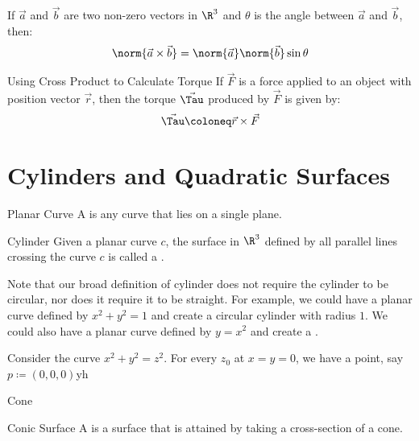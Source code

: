\documentclass[12pt]{report}
\begin{document}
\begin{thmbox}{}{}
    If $\vec{a}$ and $\vec{b}$ are two non-zero vectors in $\R^3$ and $\theta$ is the angle between $\vec{a}$ and $\vec{b}$, then:
    \[ \norm{\vec{a} \times \vec{b}} = \norm{\vec{a}} \norm{\vec{b}} \sin{\theta} \]
\end{thmbox}

\begin{tecbox}{Using Cross Product to Calculate Torque}{}
    If $\vec{F}$ is a force applied to an object with position vector $\vec{r}$, then the torque $\vec{\Tau}$ produced by $\vec{F}$ is given by:
    \[ \vec{\Tau} \coloneq \vec{r} \times \vec{F} \]
\end{tecbox}

\section{Cylinders and Quadratic Surfaces}

\begin{dfnbox}{Planar Curve}{}
    A  is any curve that lies on a single plane.
\end{dfnbox}

\begin{dfnbox}{Cylinder}{}
    Given a planar curve $c$, the surface in $\R^3$ defined by all parallel lines crossing the curve $c$ is called a .
\end{dfnbox}

Note that our broad definition of cylinder does not require the cylinder to be circular, nor does it require it to be straight. For example, we could have a planar curve defined by $x^2 + y^2 = 1$ and create a circular cylinder with radius $1$. We could also have a planar curve defined by $y = x^2$ and create a .

\begin{exbox}{}{}
    Consider the curve $x^2+y^2=z^2$. For every $z_0$ at $x=y=0$, we have a point, say $p \coloneq (0,0,0)$yh
\end{exbox}

\begin{dfnbox}{Cone}{}

\end{dfnbox}

\begin{dfnbox}{Conic Surface}{}
    A  is a surface that is attained by taking a cross-section of a cone.
\end{dfnbox}
\end{document}
